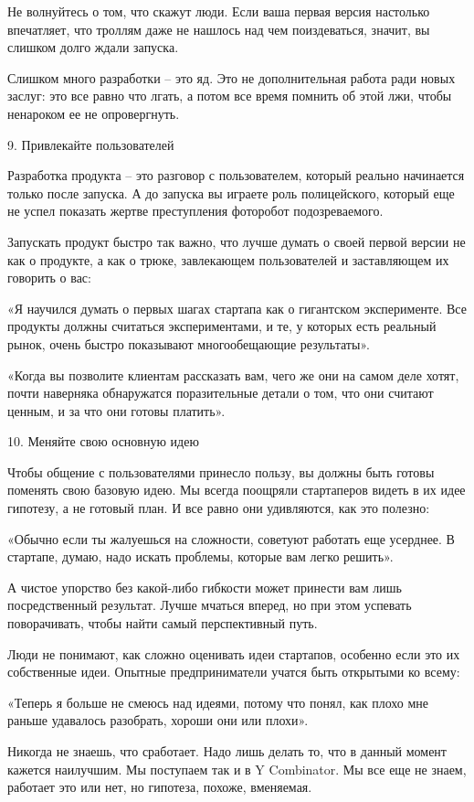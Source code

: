 \documentclass[ebook,12pt,oneside,openany]{memoir}
\begin{document}
Не волнуйтесь о том, что скажут люди. Если ваша первая версия
настолько впечатляет, что троллям даже не нашлось над чем
поиздеваться, значит, вы слишком долго ждали запуска.

Слишком много разработки – это яд. Это не дополнительная работа ради
новых заслуг: это все равно что лгать, а потом все время помнить об
этой лжи, чтобы ненароком ее не опровергнуть.

9. Привлекайте пользователей

Разработка продукта – это разговор с пользователем, который реально
начинается только после запуска. А до запуска вы играете роль
полицейского, который еще не успел показать жертве преступления
фоторобот подозреваемого.

Запускать продукт быстро так важно, что лучше думать о своей первой
версии не как о продукте, а как о трюке, завлекающем пользователей и
заставляющем их говорить о вас:

«Я научился думать о первых шагах стартапа как о гигантском
эксперименте. Все продукты должны считаться экспериментами, и те, у
которых есть реальный рынок, очень быстро показывают многообещающие
результаты».

«Когда вы позволите клиентам рассказать вам, чего же они на самом деле
хотят, почти наверняка обнаружатся поразительные детали о том, что они
считают ценным, и за что они готовы платить».

10. Меняйте свою основную идею

Чтобы общение с пользователями принесло пользу, вы должны быть готовы
поменять свою базовую идею. Мы всегда поощряли стартаперов видеть в их
идее гипотезу, а не готовый план. И все равно они удивляются, как это
полезно:

«Обычно если ты жалуешься на сложности, советуют работать еще
усерднее. В стартапе, думаю, надо искать проблемы, которые вам легко
решить».

А чистое упорство без какой-либо гибкости может принести вам лишь
посредственный результат. Лучше мчаться вперед, но при этом успевать
поворачивать, чтобы найти самый перспективный путь.

Люди не понимают, как сложно оценивать идеи стартапов, особенно если
это их собственные идеи. Опытные предприниматели учатся быть открытыми
ко всему:

«Теперь я больше не смеюсь над идеями, потому что понял, как плохо мне
раньше удавалось разобрать, хороши они или плохи».

Никогда не знаешь, что сработает. Надо лишь делать то, что в данный
момент кажется наилучшим. Мы поступаем так и в Y Combinator. Мы все
еще не знаем, работает это или нет, но гипотеза, похоже, вменяемая.
\end{document}
